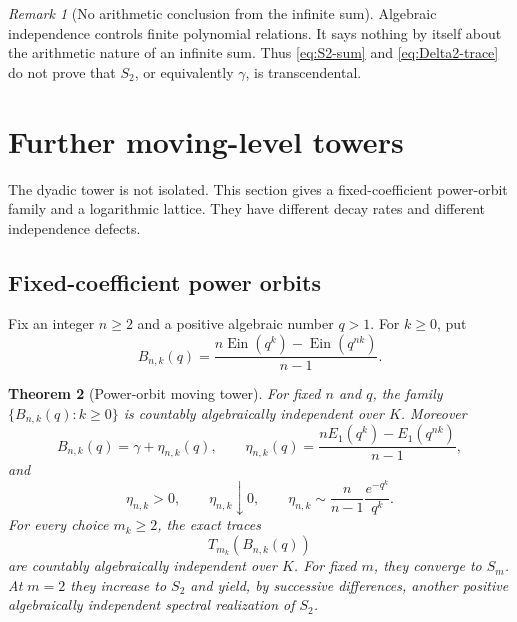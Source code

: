 \documentclass[11pt]{article}
\theoremstyle{keio}
\newtheorem{theorem}{Theorem}[section]
\theoremstyle{definition}
\theoremstyle{remark}
\newtheorem{remark}[theorem]{Remark}
\newcommand{\Ein}{\operatorname{Ein}}
\begin{document}
\begin{remark}[No arithmetic conclusion from the infinite sum]
Algebraic independence controls finite polynomial relations.  It says
nothing by itself about the arithmetic nature of an infinite sum.  Thus
\eqref{eq:S2-sum} and \eqref{eq:Delta2-trace} do not prove that \(S_2\), or
equivalently \(\gamma\), is transcendental.
\end{remark}

\section{Further moving-level towers}
\label{sec:other-towers}

The dyadic tower is not isolated.  This section gives a fixed-coefficient
power-orbit family and a logarithmic lattice.  They have different decay
rates and different independence defects.

\subsection{Fixed-coefficient power orbits}

Fix an integer \(n\ge2\) and a positive algebraic number \(q>1\).  For
\(k\ge0\), put
\begin{equation}\label{eq:Bnk}
 B_{n,k}(q)=
 \frac{n\Ein(q^k)-\Ein(q^{nk})}{n-1}.
\end{equation}

\begin{theorem}[Power-orbit moving tower]
\label{thm:power-orbit}
For fixed \(n\) and \(q\), the family
\(\{B_{n,k}(q):k\ge0\}\) is countably algebraically independent over \(K\).
Moreover
\begin{equation}\label{eq:eta-nk}
 B_{n,k}(q)=\gamma+\eta_{n,k}(q),\qquad
 \eta_{n,k}(q)=
 \frac{nE_1(q^k)-E_1(q^{nk})}{n-1},
\end{equation}
and
\begin{equation}\label{eq:eta-properties}
 \eta_{n,k}>0,\qquad
 \eta_{n,k}\downarrow0,\qquad
 \eta_{n,k}\sim
 \frac n{n-1}\frac{e^{-q^k}}{q^k}.
\end{equation}
For every choice \(m_k\ge2\), the exact traces
\[
 T_{m_k}(B_{n,k}(q))
\]
are countably algebraically independent over \(K\).  For fixed \(m\), they
converge to \(S_m\).  At \(m=2\) they increase to \(S_2\) and yield, by
successive differences, another positive algebraically independent spectral
realization of \(S_2\).
\end{theorem}
\end{document}
